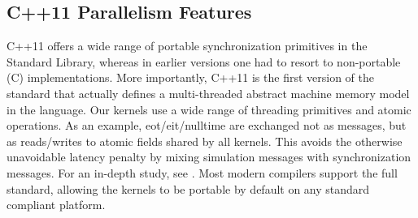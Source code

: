 \subsection{C++11 Parallelism Features}
C++11 offers a wide range of portable synchronization primitives in the Standard Library, whereas in earlier versions one had to resort to non-portable (C) implementations. More importantly, C++11 is the first version of the standard that actually defines a multi-threaded abstract machine memory model in the language.
Our kernels use a wide range of threading primitives and atomic operations. As an example, eot/eit/nulltime are exchanged not as messages, but as reads/writes to atomic fields shared by all kernels. This avoids the otherwise unavoidable latency penalty by mixing simulation messages with synchronization messages. For an in-depth study, see \cite{CPE:CPE3007}.
Most modern compilers support the full standard, allowing the kernels to be portable by default on any standard compliant platform. 
